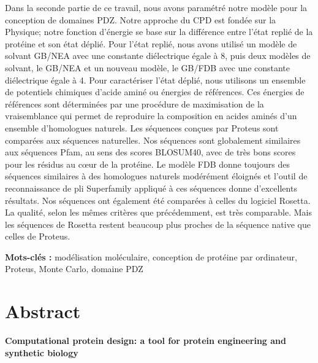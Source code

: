 Dans la seconde partie de ce travail, nous avons paramétré notre modèle pour la conception de domaines PDZ. Notre approche du CPD est fondée sur la Physique; notre fonction d’énergie se base sur la différence entre l’état replié de la protéine et son état déplié. Pour l’état replié, nous avons utilisé un modèle de solvant GB/NEA avec une constante diélectrique égale à 8, puis  deux modèles de solvant, le GB/NEA et un nouveau modèle, le GB/FDB avec une constante diélectrique égale à 4. Pour caractériser l’état déplié, nous utilisons un ensemble de potentiels chimiques d’acide aminé ou énergies de références. Ces énergies de références sont déterminées par une procédure de maximisation de la vraisemblance qui permet de reproduire la composition en acides aminés d’un ensemble d’homologues naturels. Les séquences conçues par Proteus sont comparées aux séquences naturelles. Nos séquences sont globalement similaires aux séquences Pfam, au sens des scores BLOSUM40, avec de très bons scores pour les résidus au cœur de la protéine. Le modèle FDB donne toujours des séquences similaires à des homologues naturels modérément éloignés et l’outil de reconnaissance de pli Superfamily appliqué à ces séquences donne d’excellents résultats. Nos séquences ont également été comparées à celles du logiciel Rosetta. La qualité, selon les mêmes critères que précédemment, est très comparable. Mais les séquences de Rosetta restent beaucoup plus proches de la séquence native que celles de Proteus.   


\bigskip

\textbf{Mots-clés :} modélisation moléculaire, conception de protéine par ordinateur, Proteus, Monte Carlo, domaine PDZ

\vfill



\section*{Abstract}

{\large\bf\noindent Computational protein design: a tool for protein engineering and synthetic biology}

\bigskip

